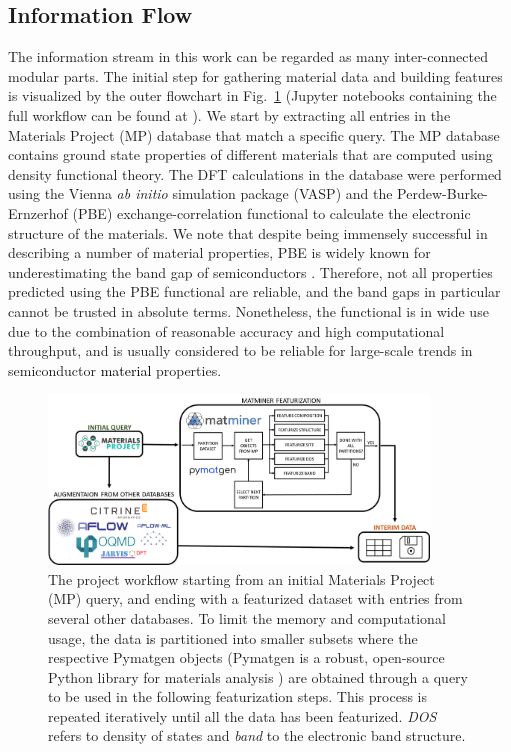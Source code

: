 \documentclass[superscriptaddress,unsortedaddress,
 amsmath,amssymb,
 aps,
]{revtex4-2}
\newcommand{\mrk}[1]{\textcolor{black}{#1}}
\begin{document}
\subsection*{Information Flow} 
The information stream in this work can be regarded as many inter-connected modular parts. 
The initial step for gathering material data and building features is visualized by the outer flowchart in Fig.~\ref{fig:flowchart} (Jupyter notebooks containing the full 
workflow can be found at \cite{Ohebbi2021}).
We start by extracting all entries in the Materials Project (MP) database  \cite{Jain2013,Jain2018} that match a specific query.  
The MP database contains ground state properties of different materials that are computed using density functional theory. The DFT calculations in the database were performed using the Vienna {\em ab initio} simulation package (VASP) \cite{Kresse1996} and the Perdew-Burke-Ernzerhof (PBE) \cite{Perdew1996} exchange-correlation functional to calculate the electronic structure of the materials. 
We note that despite being immensely successful in describing a number of material properties, PBE is widely known for underestimating the band gap of semiconductors \cite{Freysoldt2014}. Therefore, not all properties predicted using the PBE functional are reliable, and the band gaps in particular cannot be trusted in absolute terms. Nonetheless, the functional is in wide use due to the combination of reasonable accuracy and high computational throughput, and is usually considered to be reliable for large-scale trends in semiconductor \mrk{material} properties. 

\begin{figure}[t]
    \centering
    \includegraphics[width=0.9\textwidth]{figure2.png}
    \caption{The project workflow starting from an initial Materials Project (MP) query, and ending with a featurized dataset with entries from several other databases. 
    To limit the memory and computational usage, the data \mrk{is} partitioned into smaller subsets where the respective Pymatgen objects (Pymatgen is a robust, open-source Python library for materials analysis \cite{pymatgen}) are obtained through a query to be used in the following featurization steps. This process is repeated iteratively until all the data has been featurized. \emph{DOS} refers to density of states and \emph{band} to the electronic band structure. 
    }
    \label{fig:flowchart}
\end{figure}
\end{document}
